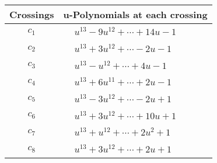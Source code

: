 \documentclass[1p]{elsarticle_modified}
\theoremstyle{definition}
\begin{document}
\begin{tabular}{m{50pt}|m{274pt}}
Crossings & \hspace{64pt}u-Polynomials at each crossing \\
\hline $$\begin{aligned}c_{1}\end{aligned}$$&$\begin{aligned}
&u^{13}-9 u^{12}+\cdots+14 u-1
\end{aligned}$\\
\hline $$\begin{aligned}c_{2}\end{aligned}$$&$\begin{aligned}
&u^{13}+3 u^{12}+\cdots-2 u-1
\end{aligned}$\\
\hline $$\begin{aligned}c_{3}\end{aligned}$$&$\begin{aligned}
&u^{13}- u^{12}+\cdots+4 u-1
\end{aligned}$\\
\hline $$\begin{aligned}c_{4}\end{aligned}$$&$\begin{aligned}
&u^{13}+6 u^{11}+\cdots+2 u-1
\end{aligned}$\\
\hline $$\begin{aligned}c_{5}\end{aligned}$$&$\begin{aligned}
&u^{13}-3 u^{12}+\cdots-2 u+1
\end{aligned}$\\
\hline $$\begin{aligned}c_{6}\end{aligned}$$&$\begin{aligned}
&u^{13}+3 u^{12}+\cdots+10 u+1
\end{aligned}$\\
\hline $$\begin{aligned}c_{7}\end{aligned}$$&$\begin{aligned}
&u^{13}+u^{12}+\cdots+2 u^2+1
\end{aligned}$\\
\hline $$\begin{aligned}c_{8}\end{aligned}$$&$\begin{aligned}
&u^{13}+3 u^{12}+\cdots+2 u+1
\end{aligned}$\\

\end{tabular}
\end{document}
